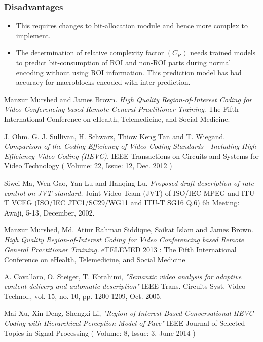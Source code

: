 \documentclass[11pt]{article} %
\begin{document}
\subsubsection*{Disadvantages}
\begin{itemize}
\item This requires changes to bit-allocation module and hence more complex to implement.
\item The determination of relative complexity factor $(C_R)$ needs trained models to predict bit-consumption of ROI and non-ROI parts during normal encoding without using ROI information. This prediction model has bad accuracy for macroblocks encoded with inter prediction. 
\end{itemize}
%
%
%
%
%
\clearpage
\begin{thebibliography}{9}
Manzur Murshed and James Brown. 
\textit{High Quality Region-of-Interest Coding for Video Conferencing based Remote General Practitioner Training}. 
The Fifth International Conference on eHealth, Telemedicine, and Social Medicine.

J. Ohm. G. J. Sullivan, H. Schwarz, Thiow Keng Tan and T. Wiegand.
\textit{Comparison of the Coding Efficiency of Video Coding Standards—Including High Efficiency Video Coding (HEVC).}
 IEEE Transactions on Circuits and Systems for Video Technology ( Volume: 22, Issue: 12, Dec. 2012 )

Siwei Ma, Wen Gao, Yan Lu and Hanqing Lu.
\textit{Proposed draft description of rate control on JVT standard. }
Joint Video Team (JVT) of ISO/IEC MPEG and ITU-T VCEG (ISO/IEC JTC1/SC29/WG11 and ITU-T SG16 Q.6) 6h Meeting: Awaji, 5-13, December, 2002.

Manzur Murshed, Md. Atiur Rahman Siddique, Saikat Islam and James Brown.
\textit{High Quality Region-of-Interest Coding for Video Conferencing based Remote General Practitioner Training.}
eTELEMED 2013 : The Fifth International Conference on eHealth, Telemedicine, and Social Medicine

A. Cavallaro, O. Steiger, T. Ebrahimi, \textit{"Semantic video analysis for adaptive content delivery and automatic description"}
IEEE Trans. Circuits Syst. Video Technol., vol. 15, no. 10, pp. 1200-1209, Oct. 2005.

Mai Xu, Xin Deng, Shengxi Li, \textit{"Region-of-Interest Based Conversational HEVC Coding with Hierarchical Perception Model of Face"}
IEEE Journal of Selected Topics in Signal Processing ( Volume: 8, Issue: 3, June 2014 )


\end{thebibliography}
\end{document}
